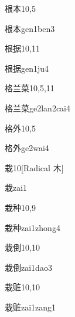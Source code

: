 \begin{entry}{根本}{10,5}
  \begin{phonetics}{根本}{gen1ben3}
  \end{phonetics}
\end{entry}

\begin{entry}{根据}{10,11}
  \begin{phonetics}{根据}{gen1ju4}
  \end{phonetics}
\end{entry}

\begin{entry}{格兰菜}{10,5,11}
  \begin{phonetics}{格兰菜}{ge2lan2cai4}
  \end{phonetics}
\end{entry}

\begin{entry}{格外}{10,5}
  \begin{phonetics}{格外}{ge2wai4}
  \end{phonetics}
\end{entry}

\begin{entry}{栽}{10}[Radical 木]
  \begin{phonetics}{栽}{zai1}
  \end{phonetics}
\end{entry}

\begin{entry}{栽种}{10,9}
  \begin{phonetics}{栽种}{zai1zhong4}
  \end{phonetics}
\end{entry}

\begin{entry}{栽倒}{10,10}
  \begin{phonetics}{栽倒}{zai1dao3}
  \end{phonetics}
\end{entry}

\begin{entry}{栽赃}{10,10}
  \begin{phonetics}{栽赃}{zai1zang1}
  \end{phonetics}
\end{entry}

